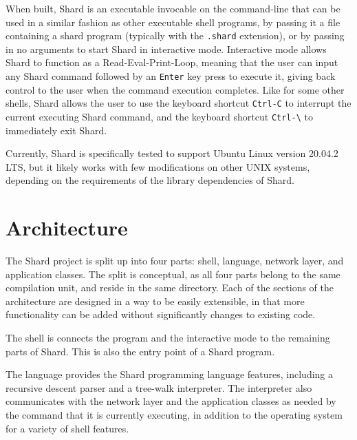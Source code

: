 \documentclass[oneside]{report}
\begin{document}
When built, Shard is an executable invocable on the command-line that can be used in a similar fashion as other executable shell programs, by passing it a file containing a shard program (typically with the \texttt{.shard} extension), or by passing in no arguments to start Shard in interactive mode.
Interactive mode allows Shard to function as a Read-Eval-Print-Loop, meaning that the user can input any Shard command followed by an \texttt{Enter} key press to execute it, giving back control to the user when the command execution completes.
Like for some other shells, Shard allows the user to use the keyboard shortcut \texttt{Ctrl-C} to interrupt the current executing Shard command, and the keyboard shortcut \texttt{Ctrl-\textbackslash} to immediately exit Shard.

Currently, Shard is specifically tested to support Ubuntu Linux version 20.04.2 LTS, but it likely works with few modifications on other UNIX systems, depending on the requirements of the library dependencies of Shard.

\section{Architecture}


The Shard project is split up into four parts: shell, language, network layer, and application classes. The split is conceptual, as all four parts belong to the same compilation unit, and reside in the same directory.
Each of the sections of the architecture are designed in a way to be easily extensible, in that more functionality can be added without significantly changes to existing code.

The shell is connects the program and the interactive mode to the remaining parts of Shard. This is also the entry point of a Shard program.

The language provides the Shard programming language features, including a recursive descent parser and a tree-walk interpreter. The interpreter also communicates with the network layer and the application classes as needed by the command that it is currently executing, in addition to the operating system for a variety of shell features.
\end{document}
